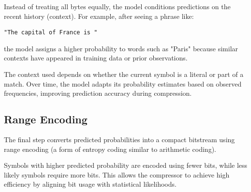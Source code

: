Instead of treating all bytes equally, the model conditions predictions on the recent history (context). For example, after seeing a phrase like:

\begin{verbatim}
"The capital of France is "
\end{verbatim}

the model assigns a higher probability to words such as "Paris" because similar contexts have appeared in training data or prior observations.

The context used depends on whether the current symbol is a literal or part of a match. Over time, the model adapts its probability estimates based on observed frequencies, improving prediction accuracy during compression.
\subsection{Range Encoding}

The final step converts predicted probabilities into a compact bitstream using range encoding (a form of entropy coding similar to arithmetic coding).

Symbols with higher predicted probability are encoded using fewer bits, while less likely symbols require more bits. This allows the compressor to achieve high efficiency by aligning bit usage with statistical likelihoods.
